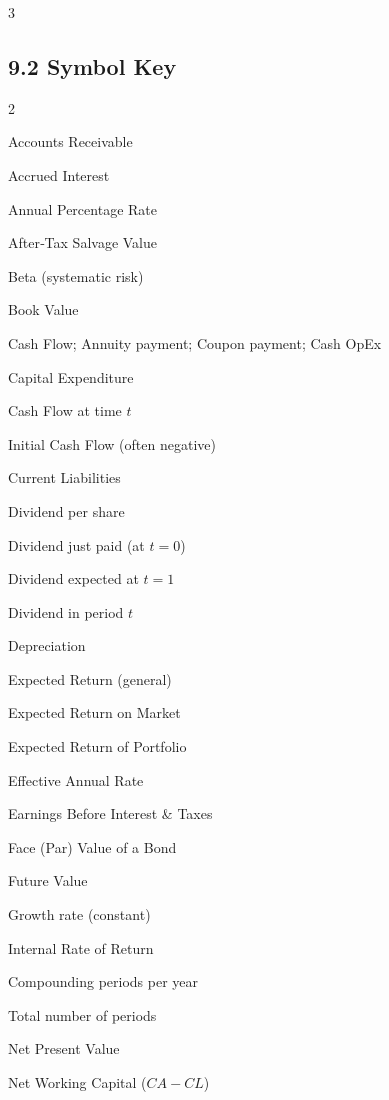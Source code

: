 \documentclass[10pt,landscape,fleqn]{article}
\begin{document}
\begin{multicols*}{3}
\subsection*{9.2 Symbol Key}
\tiny
\begin{multicols}{2}
\begin{description}[leftmargin=1.4cm,labelwidth=1.2cm,itemsep=0.5pt]
  \item[$A/R$] Accounts Receivable
  \item[$AI$] Accrued Interest
  \item[$APR$] Annual Percentage Rate
  \item[$ATSV$] After‐Tax Salvage Value
  \item[$\beta$] Beta (systematic risk)
  \item[$BV$] Book Value
  \item[$C$] Cash Flow; Annuity payment; Coupon payment; Cash OpEx
  \item[$CapEx$] Capital Expenditure
  \item[$CF_t$] Cash Flow at time \(t\)
  \item[$CF_0$] Initial Cash Flow (often negative)
  \item[$CL$] Current Liabilities
  \item[$D$] Dividend per share
  \item[$D_0$] Dividend just paid (at \(t=0\))
  \item[$D_1$] Dividend expected at \(t=1\)
  \item[$D_t$] Dividend in period \(t\)
  \item[$Dep$] Depreciation
  \item[$E(R)$] Expected Return (general)
  \item[$E(R_m)$] Expected Return on Market
  \item[$E(R_p)$] Expected Return of Portfolio
  \item[$EAR$] Effective Annual Rate
  \item[$EBIT$] Earnings Before Interest \& Taxes
  \item[$F$] Face (Par) Value of a Bond
  \item[$FV$] Future Value
  \item[$g$] Growth rate (constant)
  \item[$IRR$] Internal Rate of Return
  \item[$m$] Compounding periods per year
  \item[$n$] Total number of periods
  \item[$NPV$] Net Present Value
  \item[$NWC$] Net Working Capital (\(CA - CL\))

\end{description}
\end{multicols}
\end{multicols*}
\end{document}
